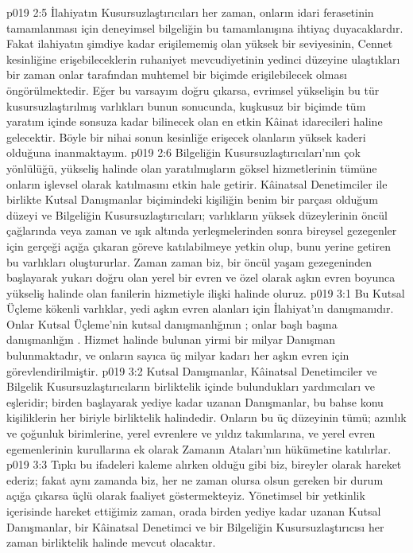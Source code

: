\vs p019 2:5 İlahiyatın Kusursuzlaştırıcıları her zaman, onların idari ferasetinin tamamlanması için deneyimsel bilgeliğin bu tamamlanışına ihtiyaç duyacaklardır. Fakat ilahiyatın şimdiye kadar erişilememiş olan yüksek bir seviyesinin, Cennet kesinliğine erişebileceklerin ruhaniyet mevcudiyetinin yedinci düzeyine ulaştıkları bir zaman  onlar tarafından muhtemel bir biçimde erişilebilecek olması öngörülmektedir. Eğer bu varsayım doğru çıkarsa, evrimsel yükselişin bu tür kusursuzlaştırılmış varlıkları bunun sonucunda, kuşkusuz bir biçimde tüm yaratım içinde sonsuza kadar bilinecek olan en etkin Kâinat idarecileri haline gelecektir. Böyle bir nihai sonun kesinliğe erişecek olanların yüksek kaderi olduğuna inanmaktayım.
\vs p019 2:6 Bilgeliğin Kusursuzlaştırıcıları’nın çok yönlülüğü, yükseliş halinde olan yaratılmışların göksel hizmetlerinin tümüne onların işlevsel olarak katılmasını etkin hale getirir. Kâinatsal Denetimciler ile birlikte Kutsal Danışmanlar biçimindeki kişiliğin benim bir parçası olduğum düzeyi ve Bilgeliğin Kusursuzlaştırıcıları; varlıkların yüksek düzeylerinin öncül çağlarında veya zaman ve ışık altında yerleşmelerinden sonra bireysel gezegenler için gerçeği açığa çıkaran göreve katılabilmeye yetkin olup, bunu yerine getiren bu varlıkları oluştururlar. Zaman zaman biz, bir öncül yaşam gezegeninden başlayarak yukarı doğru olan yerel bir evren ve özel olarak aşkın evren boyunca yükseliş halinde olan fanilerin hizmetiyle ilişki halinde oluruz.
\vs p019 3:1 Bu Kutsal Üçleme kökenli varlıklar, yedi aşkın evren alanları için İlahiyat’ın danışmanıdır. Onlar Kutsal Üçleme’nin kutsal danışmanlığının ; onlar başlı başına danışmanlığın . Hizmet halinde bulunan yirmi bir milyar Danışman bulunmaktadır, ve onların sayıca üç milyar kadarı her aşkın evren için görevlendirilmiştir.
\vs p019 3:2 Kutsal Danışmanlar, Kâinatsal Denetimciler ve Bilgelik Kusursuzlaştırıcıların birliktelik içinde bulundukları yardımcıları ve eşleridir; birden başlayarak yediye kadar uzanan Danışmanlar, bu bahse konu kişiliklerin her biriyle birliktelik halindedir. Onların bu üç düzeyinin tümü; azınlık ve çoğunluk birimlerine, yerel evrenlere ve yıldız takımlarına, ve yerel evren egemenlerinin kurullarına ek olarak Zamanın Ataları’nın hükümetine katılırlar.
\vs p019 3:3 Tıpkı bu ifadeleri kaleme alırken olduğu gibi biz, bireyler olarak hareket ederiz; fakat aynı zamanda biz, her ne zaman olursa olsun gereken bir durum açığa çıkarsa üçlü olarak faaliyet göstermekteyiz. Yönetimsel bir yetkinlik içerisinde hareket ettiğimiz zaman, orada birden yediye kadar uzanan Kutsal Danışmanlar, bir Kâinatsal Denetimci ve bir Bilgeliğin Kusursuzlaştırıcısı her zaman birliktelik halinde mevcut olacaktır.
